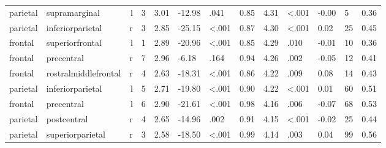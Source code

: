 \documentclass{article}
\begin{document}
\begin{longtable}{llrR{1.3cm}R{1cm}R{1.3cm}R{1cm}R{1cm}R{1.3cm}R{1cm}R{1.8cm}R{1.3cm}R{1.8cm}}
  parietal &             supramarginal &    l &         3 &                  3.01 &           -12.98 &               .041 &                               0.85 &                          4.31 &                   \textless.001 &  -0.00 &      5 &      0.36 \\
  parietal &          inferiorparietal &    r &         3 &                  2.85 &           -25.15 &      \textless.001 &                               0.87 &                          4.30 &                   \textless.001 &   0.02 &     25 &      0.45 \\
   frontal &           superiorfrontal &    l &         1 &                  2.89 &           -20.96 &      \textless.001 &                               0.85 &                          4.29 &                            .010 &  -0.01 &     10 &      0.36 \\
   frontal &                precentral &    r &         7 &                  2.96 &            -6.18 &               .164 &                               0.94 &                          4.26 &                            .002 &  -0.05 &     12 &      0.41 \\
   frontal &      rostralmiddlefrontal &    r &         4 &                  2.63 &           -18.31 &      \textless.001 &                               0.86 &                          4.22 &                            .009 &   0.08 &     14 &      0.43 \\
  parietal &          inferiorparietal &    l &         5 &                  2.71 &           -19.80 &      \textless.001 &                               0.90 &                          4.22 &                   \textless.001 &   0.01 &     60 &      0.51 \\
   frontal &                precentral &    l &         6 &                  2.90 &           -21.61 &      \textless.001 &                               0.98 &                          4.16 &                            .006 &  -0.07 &     68 &      0.53 \\
  parietal &               postcentral &    r &         4 &                  2.65 &           -14.96 &               .002 &                               0.91 &                          4.15 &                   \textless.001 &  -0.02 &     25 &      0.44 \\
  parietal &          superiorparietal &    r &         3 &                  2.58 &           -18.50 &      \textless.001 &                               0.99 &                          4.14 &                            .003 &   0.04 &     99 &      0.56 \\

\end{longtable}
\end{document}
